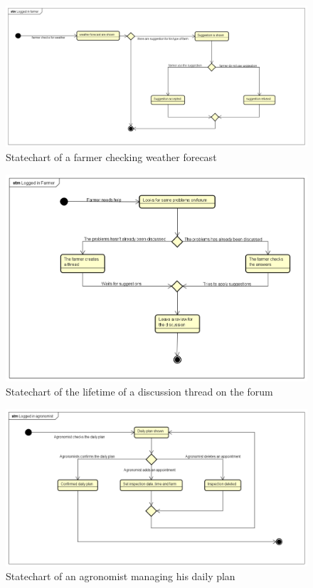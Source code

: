\begin{figure}[H]
    \includegraphics[width=\textwidth,height=\textheight,keepaspectratio]{Images/farmerChecksWeather.png}
    \caption{Statechart of a farmer checking weather forecast}
    \label{fig:statechart_farmer_weather}
\end{figure}

\begin{figure}[H]
    \includegraphics[width=\textwidth,height=\textheight,keepaspectratio]{Images/farmerCreatesThread.png}
    \caption{Statechart of the lifetime of a discussion thread on the forum}
    \label{fig:statechart_farmer_thread}
\end{figure}

\begin{figure}[H]
    \includegraphics[width=\textwidth,height=\textheight,keepaspectratio]{Images/agronomistDailyPlan.png}
    \caption{Statechart of an agronomist managing his daily plan}
    \label{fig:statechart_agronomist_plan}
\end{figure}

